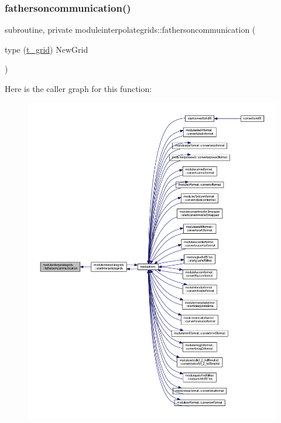 \subsubsection{\texorpdfstring{fathersoncommunication()}{fathersoncommunication()}}
{\footnotesize\ttfamily subroutine, private moduleinterpolategrids\+::fathersoncommunication (\begin{DoxyParamCaption}\item[{type (\mbox{\hyperlink{structmoduleinterpolategrids_1_1t__grid}{t\+\_\+grid}})}]{New\+Grid }\end{DoxyParamCaption})\hspace{0.3cm}{\ttfamily [private]}}

Here is the caller graph for this function\+:\nopagebreak
\begin{figure}[H]
\begin{center}
\leavevmode
\includegraphics[width=350pt]{namespacemoduleinterpolategrids_a20e11038e33700a28ecb799dc0420e26_icgraph}
\end{center}
\end{figure}
\mbox{\label{namespacemoduleinterpolategrids_aedd9412531395a797c1d8d210aeacfff}} 
